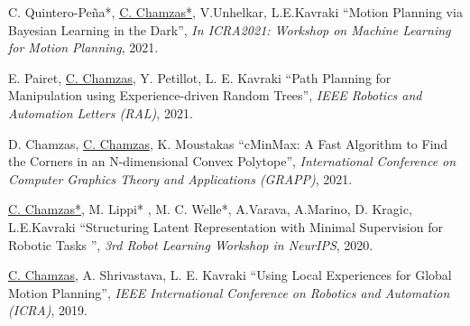 \documentclass[letterpaper,11pt]{article}
\begin{document}
\begin{thebibliography}{14}
     C. Quintero-Peña*, \underline{C. Chamzas*}, V.Unhelkar, L.E.Kavraki
	``Motion Planning via Bayesian Learning in the Dark'',
    \textit{In ICRA2021: Workshop on Machine Learning for Motion Planning}, 2021.  

	E. Pairet, \underline{C. Chamzas}, Y. Petillot, L. E. Kavraki
	``Path Planning for Manipulation using Experience-driven Random Trees'',
    \textit{IEEE Robotics and Automation Letters (RAL)}, 2021.
	
	D. Chamzas, \underline{C. Chamzas}, K. Moustakas
	``cMinMax: A Fast Algorithm to Find the Corners in an N-dimensional Convex Polytope'',
    \textit{International Conference on Computer Graphics Theory and Applications (GRAPP)}, 2021. 

	\underline{C. Chamzas*}, M. Lippi* , M. C. Welle*, A.Varava, A.Marino, D. Kragic, L.E.Kavraki
    ``Structuring Latent Representation with Minimal Supervision for Robotic Tasks '',
    \textit{3rd Robot Learning Workshop in NeurIPS}, 2020. 

	\underline{C. Chamzas}, A. Shrivastava, L. E. Kavraki
	``Using Local Experiences for Global Motion Planning'',
    \textit{IEEE International Conference on Robotics and Automation (ICRA)}, 2019.
   
	\end{thebibliography}
	\endgroup
\end{document}
